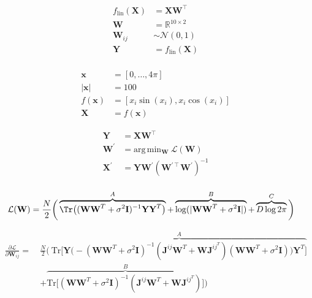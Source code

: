 


\begin{align*}
f_\text{lin}(\textbf{X}) &= \textbf{X}\textbf{W}^\intercal \\
\textbf{W} &= \mathbb{R}^{10\times2} \\
\textbf{W}_{ij} &\sim \mathcal{N}(0,1) \\
\textbf{Y} &= f_{\text{lin}}(\textbf{X}) \\
\end{align*}

\begin{align*}
\textbf{x} &= [0,\ldots,4\pi] \\
\lvert\textbf{x}\rvert &= 100 \\
f(\textbf{x}) &= [x_i \sin(x_i), x_i \cos(x_i)] \\
\textbf{X} &= f(\textbf{x})
\end{align*}

\begin{align*}
\textbf{Y} &= \textbf{X}\textbf{W}^\intercal \\
\textbf{W}^\prime &= \text{arg}\,\text{min}_\textbf{W}\ \mathcal{L}(\mathbf{W}) \\
\textbf{X}^\prime &= \textbf{Y}\textbf{W}^\prime(\textbf{W}^{\prime\intercal}\textbf{W}^\prime)^{-1} \\
\end{align*}

\begin{align*}
\mathcal{L}(\textbf{W}) &= \frac{N}{2}\bigg(\overbrace{\Tr\big((\textbf{W}\textbf{W}^T+\sigma^2\textbf{I})^{-1}\textbf{Y}\textbf{Y}^T\big)}^{A} + \overbrace{\log(\lvert\textbf{W}\textbf{W}^T+\sigma^2\textbf{I}\vert)}^{B} + \overbrace{D\log2\pi}^{C}\bigg)
\end{align*}

\begin{align*}
\frac{\partial\mathcal{L}}{\partial\textbf{W}_{ij}} =\ &\frac{N}{2}\Bigg(\ \overbrace{\text{Tr}\Big[\textbf{Y}\big(-(\textbf{W}\textbf{W}^T+\sigma^2\textbf{I})^{-1}(\textbf{J}^{ij}\textbf{W}^T + \textbf{W}\textbf{J}^{ij}^T)(\textbf{W}\textbf{W}^T+\sigma^2\textbf{I})\big)\textbf{Y}^T\Big]}^{A} \\ 
	&+ \overbrace{\text{Tr}\Big[(\textbf{W}\textbf{W}^T+\sigma^2\textbf{I})^{-1}(\textbf{J}^{ij}\textbf{W}^T + \textbf{W}\textbf{J}^{ij}^T)\Big]}^{B}\Bigg)
\end{align*}
